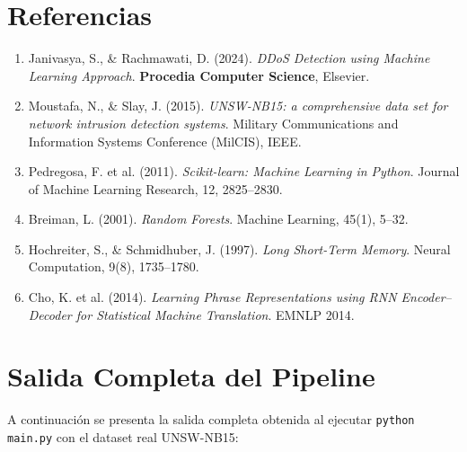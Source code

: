 \documentclass[12pt,a4paper]{article}
\begin{document}
\section*{Referencias}

\begin{enumerate}
    \item Janivasya, S., \& Rachmawati, D. (2024). \textit{DDoS Detection using Machine
          Learning Approach}. \textbf{Procedia Computer Science}, Elsevier.

    \item Moustafa, N., \& Slay, J. (2015). \textit{UNSW-NB15: a comprehensive data set
          for network intrusion detection systems}. Military Communications and Information
          Systems Conference (MilCIS), IEEE.

    \item Pedregosa, F. et al. (2011). \textit{Scikit-learn: Machine Learning in Python}.
          Journal of Machine Learning Research, 12, 2825--2830.

    \item Breiman, L. (2001). \textit{Random Forests}. Machine Learning, 45(1), 5--32.

    \item Hochreiter, S., \& Schmidhuber, J. (1997). \textit{Long Short-Term Memory}.
          Neural Computation, 9(8), 1735--1780.

    \item Cho, K. et al. (2014). \textit{Learning Phrase Representations using RNN
          Encoder--Decoder for Statistical Machine Translation}. EMNLP 2014.
\end{enumerate}

\appendix
\section{Salida Completa del Pipeline}
\label{sec:anexo}

A continuación se presenta la salida completa obtenida al ejecutar \texttt{python main.py}
con el dataset real UNSW-NB15:
\end{document}
